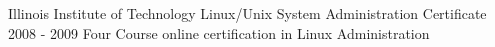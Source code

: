 \begin{cventries}
    \vspace{-0.3em}
    \cventry
        {Illinois Institute of Technology} %
        {Linux/Unix System Administration Certificate} %
	{}
        {2008 - 2009} %
        {Four Course online certification in Linux Administration}
\end{cventries}

